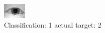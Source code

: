 \begin{figure}[h!]
\begin{center}
\includegraphics[width=0.60\columnwidth]{figures/ID981_class_1_target_2.png}
\end{center}
\caption{ Classification: 1 actual target: 2}
\label{fig:ID981_class_1_target_2}
\end{figure}
